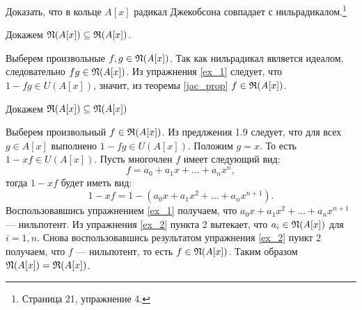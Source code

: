     \begin{Ex}
        Доказать, что в кольце $A[x]$ радикал Джекобсона совпадает с нильрадикалом.\footnote{\cite{A-M} Страница 21, упражнение 4.}
    \end{Ex}
    \begin{Proof}

        Докажем $\mathfrak{N}(A[x]) \subseteq \mathfrak{R}(A[x])$.

        Выберем произвольные $f, g \in \mathfrak{N}(A[x])$. Так как нильрадикал является идеалом, следовательно $fg \in \mathfrak{N}(A[x])$. Из упражнения \ref{ex_1} следует, что $1 - fg \in U(A[x])$,
        значит, из теоремы \ref{jac_prop} $f \in \mathfrak{R}(A[x])$.

        Докажем $\mathfrak{R}(A[x]) \subseteq \mathfrak{N}(A[x])$

        Выберем произвольный $f \in \mathfrak{R}(A[x])$. Из предлжения 1.9\cite{A-M} следует, что для всех $g \in A[x]$ выполнено $1 - fg \in U(A[x])$. Положим $g = x$. То есть $1 - xf \in U(A[x])$. Пусть
        многочлен $f$ имеет следующий вид:
        $$
            f = a_0 + a_1x + \dots + a_nx^n,
        $$
        тогда $1 - xf$ будет иметь вид:
        $$
            1 - xf = 1 - (a_0x + a_1x^2 + \dots + a_nx^{n + 1}).
        $$
        Воспользовавшись упражнением \ref{ex_1} получаем, что $a_0x + a_1x^2 + \dots + a_nx^{n + 1}$ --- нильпотент. 
        Из упражнения \ref{ex_2} пункта 2 вытекает, что $a_i \in \mathfrak{N}(A[x])$ для $i = \overline{1, n}$. 
        Снова воспользовавшись результатом упражнения \ref{ex_2} пункт 2 получаем, что $f$ --- нильпотент, то есть $f \in \mathfrak{N}(A[x])$.
        Таким образом $\mathfrak{N}(A[x]) = \mathfrak{R}(A[x])$.
    \end{Proof}

